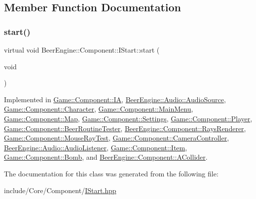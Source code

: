 \subsection{Member Function Documentation}
\mbox{\label{class_beer_engine_1_1_component_1_1_i_start_aa3e25e86e20c46cdaefc6f6d7f21e495}} 
\subsubsection{\texorpdfstring{start()}{start()}}
{\footnotesize\ttfamily virtual void Beer\+Engine\+::\+Component\+::\+I\+Start\+::start (\begin{DoxyParamCaption}\item[{void}]{ }\end{DoxyParamCaption})\hspace{0.3cm}{\ttfamily [pure virtual]}}



Implemented in \mbox{\hyperlink{class_game_1_1_component_1_1_i_a_ab440dc76a8837e291f6545e0dd15c819}{Game\+::\+Component\+::\+IA}}, \mbox{\hyperlink{class_beer_engine_1_1_audio_1_1_audio_source_aa50a60f2ff5540c9e4506b0ae001c98e}{Beer\+Engine\+::\+Audio\+::\+Audio\+Source}}, \mbox{\hyperlink{class_game_1_1_component_1_1_character_ab5ffa080b89ab20becf30a27a881d4d4}{Game\+::\+Component\+::\+Character}}, \mbox{\hyperlink{class_game_1_1_component_1_1_main_menu_a9043ca6c0ead0ef5fc048ac84171b597}{Game\+::\+Component\+::\+Main\+Menu}}, \mbox{\hyperlink{class_game_1_1_component_1_1_map_a76e2153b5f69646ba7cf77b6cd0f5096}{Game\+::\+Component\+::\+Map}}, \mbox{\hyperlink{class_game_1_1_component_1_1_settings_adc79077ed00bee2d8ed987ea4b86a331}{Game\+::\+Component\+::\+Settings}}, \mbox{\hyperlink{class_game_1_1_component_1_1_player_a317e5d073713ea27ceffe5de642240a6}{Game\+::\+Component\+::\+Player}}, \mbox{\hyperlink{class_game_1_1_component_1_1_beer_routine_tester_a7c721d466c33fd0a34e65707f55272a2}{Game\+::\+Component\+::\+Beer\+Routine\+Tester}}, \mbox{\hyperlink{class_beer_engine_1_1_component_1_1_rays_renderer_a309d7940148feada1c9497e2444a6548}{Beer\+Engine\+::\+Component\+::\+Rays\+Renderer}}, \mbox{\hyperlink{class_game_1_1_component_1_1_mouse_ray_test_ae0d25b167dd28084ddd677b0593a54f3}{Game\+::\+Component\+::\+Mouse\+Ray\+Test}}, \mbox{\hyperlink{class_game_1_1_component_1_1_camera_controller_afe64421588babbf921d77756fa38a48b}{Game\+::\+Component\+::\+Camera\+Controller}}, \mbox{\hyperlink{class_beer_engine_1_1_audio_1_1_audio_listener_a1d4d5e21f30edb7dba64e87f0712c3b3}{Beer\+Engine\+::\+Audio\+::\+Audio\+Listener}}, \mbox{\hyperlink{class_game_1_1_component_1_1_item_a69276f0e6bbd44144a5618cfe89f526a}{Game\+::\+Component\+::\+Item}}, \mbox{\hyperlink{class_game_1_1_component_1_1_bomb_a74e5f8e628a9d434f0faf91273f33990}{Game\+::\+Component\+::\+Bomb}}, and \mbox{\hyperlink{class_beer_engine_1_1_component_1_1_a_collider_a5da2e0713f11237c7a963295f508cd3b}{Beer\+Engine\+::\+Component\+::\+A\+Collider}}.



The documentation for this class was generated from the following file\+:\begin{DoxyCompactItemize}
\item 
include/\+Core/\+Component/\mbox{\hyperlink{_i_start_8hpp}{I\+Start.\+hpp}}\end{DoxyCompactItemize}
